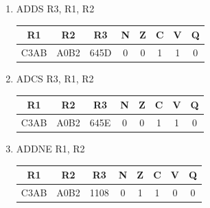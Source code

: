 \documentclass{article}
\begin{document}
\begin{enumerate}
\begin{enumerate}
        \item ADDS R3, R1, R2
	    \begin{center}
          \begin{tabular}{ | c | c | c | c | c | c | c | c | }
            \hline
            R1 & R2 & R3 & N & Z & C & V & Q \\ \hline
            C3AB & A0B2 & 645D & 0 & 0 & 1 & 1 & 0 \\ \hline
          \end{tabular}
        \end{center}
        \vspace{0.2cm}
        \item ADCS R3, R1, R2
	    \begin{center}
          \begin{tabular}{ | c | c | c | c | c | c | c | c | }
            \hline
            R1 & R2 & R3 & N & Z & C & V & Q \\ \hline
            C3AB & A0B2 & 645E & 0 & 0 & 1 & 1 & 0 \\ \hline
          \end{tabular}
        \end{center}
        \vspace{0.2cm}
        \item ADDNE R1, R2
	    \begin{center}
          \begin{tabular}{ | c | c | c | c | c | c | c | c | }
            \hline
            R1 & R2 & R3 & N & Z & C & V & Q \\ \hline
            C3AB & A0B2 & 1108 & 0 & 1 & 1 & 0 & 0 \\ \hline
          \end{tabular}
        \end{center}
    \end{enumerate}
\end{enumerate}
\end{document}
